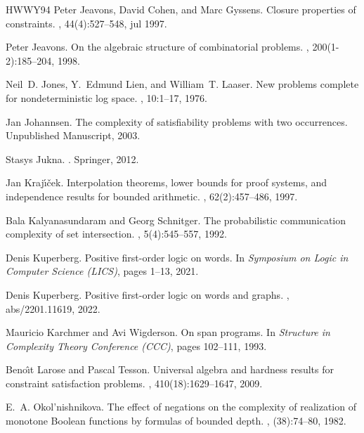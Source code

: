 \documentclass[10pt,a4paper]{article}
\begin{document}
\begin{thebibliography}{HWWY94}
Peter Jeavons, David Cohen, and Marc Gyssens.
\newblock Closure properties of constraints.
, 44(4):527–548, jul 1997.

Peter Jeavons.
\newblock On the algebraic structure of combinatorial problems.
, 200(1-2):185--204, 1998.

Neil~D. Jones, Y.~Edmund Lien, and William~T. Laaser.
\newblock New problems complete for nondeterministic log space.
, 10:1--17, 1976.

Jan Johannsen.
\newblock The complexity of satisfiability problems with two occurrences.
\newblock Unpublished Manuscript, 2003.

Stasys Jukna.
.
\newblock Springer, 2012.

Jan Kraj\'{\i}\v{c}ek.
\newblock Interpolation theorems, lower bounds for proof systems, and
  independence results for bounded arithmetic.
, 62(2):457--486, 1997.

Bala Kalyanasundaram and Georg Schnitger.
\newblock The probabilistic communication complexity of set intersection.
, 5(4):545--557, 1992.

Denis Kuperberg.
\newblock Positive first-order logic on words.
\newblock In {\em Symposium on Logic in Computer Science \emph{(LICS)}}, pages
  1--13, 2021.

Denis Kuperberg.
\newblock Positive first-order logic on words and graphs.
, abs/2201.11619, 2022.

Mauricio Karchmer and Avi Wigderson.
\newblock On span programs.
\newblock In {\em Structure in Complexity Theory Conference \emph{(CCC)}},
  pages 102--111, 1993.

Beno{\^{\i}}t Larose and Pascal Tesson.
\newblock Universal algebra and hardness results for constraint satisfaction
  problems.
, 410(18):1629--1647, 2009.

E.~A. Okol'nishnikova.
\newblock The effect of negations on the complexity of realization of monotone
  {B}oolean functions by formulas of bounded depth.
, (38):74--80, 1982.


\end{thebibliography}
\end{document}
